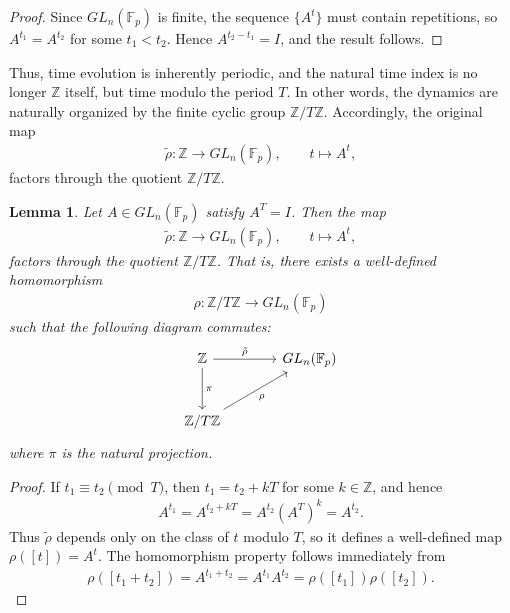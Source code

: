 \documentclass[letterpaper, 9pt, conference]{ieeeconf}
\newtheorem{lemma}[theorem]{Lemma}
\begin{document}
\begin{proof}
Since $GL_n(\mathbb{F}_p)$ is finite, the sequence $\{A^t\}$ must contain
repetitions, so $A^{t_1} = A^{t_2}$ for some $t_1 < t_2$. Hence
$A^{t_2-t_1}=I$, and the result follows.
\end{proof}

Thus, time evolution is inherently periodic, and the natural time index is no
longer $\mathbb{Z}$ itself, but time modulo the period $T$. In other words, the
dynamics are naturally organized by the finite cyclic group
$\mathbb{Z}/T\mathbb{Z}$. Accordingly, the original map
\begin{eqnarray}
\tilde{\rho}:\mathbb{Z} \to GL_n(\mathbb{F}_p), \qquad t \mapsto A^t,
\end{eqnarray}
factors through the quotient $\mathbb{Z}/T\mathbb{Z}$.

\begin{lemma}
Let $A \in GL_n(\mathbb{F}_p)$ satisfy $A^T = I$. Then the map
\begin{eqnarray}
\tilde{\rho}:\mathbb{Z} \to GL_n(\mathbb{F}_p), \qquad t \mapsto A^t,
\end{eqnarray}
factors through the quotient $\mathbb{Z}/T\mathbb{Z}$. That is, there exists a
well-defined homomorphism
\begin{eqnarray}
\rho:\mathbb{Z}/T\mathbb{Z} \to GL_n(\mathbb{F}_p)
\end{eqnarray}
such that the following diagram commutes:
\begin{equation}
\begin{tikzcd}[column sep=large, row sep=large]
\mathbb{Z} \arrow[r, "\tilde{\rho}"] \arrow[d,"\pi"] & GL_n(\mathbb{F}_p) \\
\mathbb{Z}/T\mathbb{Z} \arrow[ur, "\rho"']
\end{tikzcd}
\end{equation}
where $\pi$ is the natural projection.
\end{lemma}

\begin{proof}
If $t_1 \equiv t_2 \pmod{T}$, then $t_1=t_2+kT$ for some $k\in\mathbb{Z}$, and
hence
\begin{eqnarray*}
A^{t_1}=A^{t_2+kT}=A^{t_2}(A^T)^k=A^{t_2}.
\end{eqnarray*}
Thus $\tilde{\rho}$ depends only on the class of $t$ modulo $T$, so it defines
a well-defined map $\rho([t])=A^t$. The homomorphism property follows
immediately from
\begin{eqnarray*}
\rho([t_1+t_2]) = A^{t_1+t_2} = A^{t_1}A^{t_2} = \rho([t_1])\rho([t_2]).
\end{eqnarray*}
\end{proof}
\end{document}
